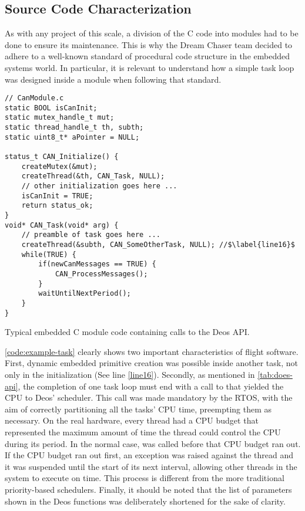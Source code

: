 {\subsection*{Source Code Characterization}
As with any project of this scale, a division of the C code into modules had to be done to ensure its maintenance. This is why the Dream Chaser team decided to adhere to a well-known standard of procedural code structure in the embedded systems world. In particular, it is relevant to understand how a simple task loop was designed inside a module when following that standard. 
\begin{listing}[H]
	\begin{verbatim}
// CanModule.c
static BOOL isCanInit;
static mutex_handle_t mut;
static thread_handle_t th, subth;
static uint8_t* aPointer = NULL;

status_t CAN_Initialize() {
	createMutex(&mut);
	createThread(&th, CAN_Task, NULL);
	// other initialization goes here ...
	isCanInit = TRUE;
	return status_ok;
}
void* CAN_Task(void* arg) {
	// preamble of task goes here ...
	createThread(&subth, CAN_SomeOtherTask, NULL); //$\label{line16}$
	while(TRUE) {
		if(newCanMessages == TRUE) {
			CAN_ProcessMessages();
		}
		waitUntilNextPeriod();
	}
}
	\end{verbatim}
	\caption{Typical embedded C module code containing calls to the Deos API.}
	\label{code:example-task}
\end{listing}

\autoref{code:example-task} clearly shows two important characteristics of flight software. First, dynamic embedded primitive creation was possible inside another task, not only in the initialization (See line \ref{line16}). Secondly, as mentioned in \autoref{tab:does-api}, the completion of one task loop must end with a call to  that yielded the CPU to Deos' scheduler. This call was made mandatory by the RTOS, with the aim of correctly partitioning all the tasks' CPU time, preempting them as necessary. On the real hardware, every thread had a CPU budget that represented the maximum amount of time the thread could control the CPU during its period. In the normal case,  was called before that CPU budget ran out. If the CPU budget ran out first, an exception was raised against the thread and it was suspended until the start of its next interval, allowing other threads in the system to execute on time. This process is different from the more traditional priority-based schedulers. Finally, it should be noted that the list of parameters shown in the Deos functions was deliberately shortened for the sake of clarity. 

}
